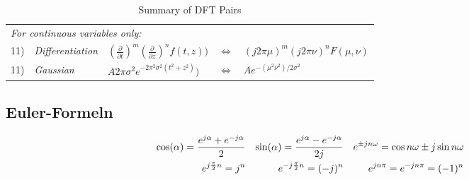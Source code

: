 \begin{table}[htbp]
\begin{tabularx}{\linewidth}{|rp{6cm}XlX|}
		\multicolumn{5}{|l|}{\textit{For continuous variables only:}} \\
		11) & \textit{Differentiation} & $\left(\frac{\partial}{\partial t}\right)^m \left(\frac{\partial}{\partial z}\right)^n f(t,z) )$ & $\Leftrightarrow$ & $ (j 2 \pi \mu)^m (j 2 \pi \nu)^n F(\mu,\nu)$ \\
		11) & \textit{Gaussian} & $A 2 \pi \sigma^2 e^{-2 \pi^2 \sigma^2 (t^2+z^2)} )$ & $\Leftrightarrow$ & $ Ae^{-(\mu^2\nu^2)/2\sigma^2}$ \\
	\hline
	\end{tabularx}
	\caption{Summary of DFT Pairs}
	\label{tab:DFT_Pairs}
\end{table}

\newpage


\begin{multicols}{2}
	
	

	\columnbreak
	
		
	
\end{multicols}

	
\subsection{Euler-Formeln}
\begin{align}
	\cos(\alpha) = \frac{e^{j\alpha} + e^{-j\alpha}}{2}
	&& \sin(\alpha) = \frac{e^{j\alpha} - e^{-j\alpha}}{2j} && 
	    {e}^{\pm jn\omega} = \cos{n\omega} \pm j \sin{n\omega} \notag\\
	e^{j\frac{\pi}{2}n} = j^n & & e^{-j\frac{\pi}{2}n} = (-j)^n &&
	e^{jn\pi}=e^{-jn\pi}=(-1)^n \notag
\end{align}
	